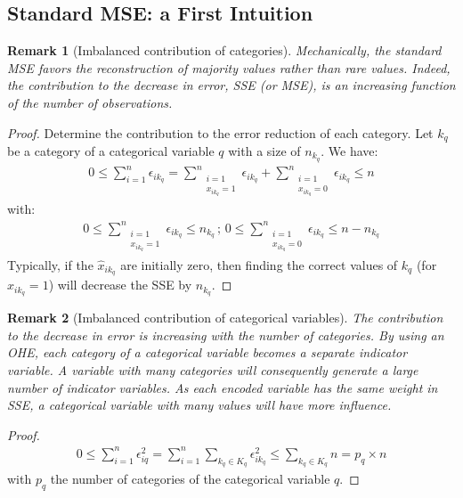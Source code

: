 \documentclass{article}
\def \w {\widehat}
\newtheorem{rem}{{\sc Remark}}
\theoremstyle{definition}
\begin{document}
\newpage
\appendix

\subsection{Standard MSE: a First Intuition} \label{sMSE_proof}
\begin{rem}[Imbalanced contribution of categories]
Mechanically, the standard MSE favors the reconstruction of majority values rather than rare values. Indeed, the contribution to the decrease in error, SSE (or MSE), is an increasing function of the number of observations.  
\end{rem}
\begin{proof}
Determine the contribution to the error reduction of each category. Let $k_q$ be a category of a categorical variable $q$ with a size of $n_{k_q}$. We have:
\begin{align*}
    0 \leq \sum_{i=1}^n \epsilon_{ik_q} = \underset{\substack{i=1 \\ x_{ik_q}=1}}{\sum^n} \epsilon_{ik_q} + \underset{\substack{i=1 \\ x_{ik_q}=0}}{\sum^n} \epsilon_{ik_q} \leq n
\end{align*}
with: 
\begin{align*}
    0 \leq \underset{\substack{i=1 \\ x_{ik_q}=1}}{\sum^n} \epsilon_{ik_q} \leq n_{k_q} \, ; \,
    0 \leq \underset{\substack{i=1 \\ x_{ik_q}=0}}{\sum^n} \epsilon_{ik_q} \leq n-n_{k_q}
\end{align*}
Typically, if the $\w x_{ik_q}$ are initially zero, then finding the correct values of $k_q$ (for $x_{ik_q}=1$) will decrease the SSE by $n_{k_q}$.
\end{proof}



\begin{rem}[Imbalanced contribution of categorical variables]
The contribution to the decrease in error is increasing with the number of categories. By using an OHE, each category of a categorical variable becomes a separate indicator variable. A variable with many categories will consequently generate a large number of indicator variables. As each encoded variable has the same weight in SSE, a categorical variable with many values will have more influence.
\end{rem}
\begin{proof}
\begin{align*}
    0 \leq \sum_{i=1}^n \epsilon_{iq}^2 = \sum_{i=1}^n \sum_{k_q \in K_q}   \epsilon_{ik_q}^2  \leq \sum_{k_q \in K_q} n = p_q \times n
\end{align*}
with $p_q$ the number of categories of the categorical variable $q$.
\end{proof}
\end{document}
